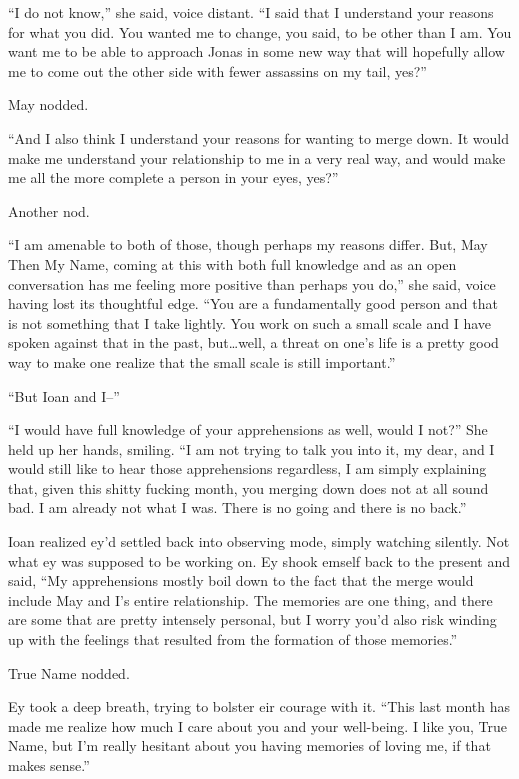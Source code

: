 ``I do not know,'' she said, voice distant. ``I said that I understand your reasons for what you did. You wanted me to change, you said, to be other than I am. You want me to be able to approach Jonas in some new way that will hopefully allow me to come out the other side with fewer assassins on my tail, yes?''

May nodded.

``And I also think I understand your reasons for wanting to merge down. It would make me understand your relationship to me in a very real way, and would make me all the more complete a person in your eyes, yes?''

Another nod.

``I am amenable to both of those, though perhaps my reasons differ. But, May Then My Name, coming at this with both full knowledge and as an open conversation has me feeling more positive than perhaps you do,'' she said, voice having lost its thoughtful edge. ``You are a fundamentally good person and that is not something that I take lightly. You work on such a small scale and I have spoken against that in the past, but\ldots well, a threat on one's life is a pretty good way to make one realize that the small scale is still important.''

``But Ioan and I--''

``I would have full knowledge of your apprehensions as well, would I not?'' She held up her hands, smiling. ``I am not trying to talk you into it, my dear, and I would still like to hear those apprehensions regardless, I am simply explaining that, given this shitty fucking month, you merging down does not at all sound bad. I am already not what I was. There is no going and there is no back.''

Ioan realized ey'd settled back into observing mode, simply watching silently. Not what ey was supposed to be working on. Ey shook emself back to the present and said, ``My apprehensions mostly boil down to the fact that the merge would include May and I's entire relationship. The memories are one thing, and there are some that are pretty intensely personal, but I worry you'd also risk winding up with the feelings that resulted from the formation of those memories.''

True Name nodded.

Ey took a deep breath, trying to bolster eir courage with it. ``This last month has made me realize how much I care about you and your well-being. I like you, True Name, but I'm really hesitant about you having memories of loving me, if that makes sense.''

